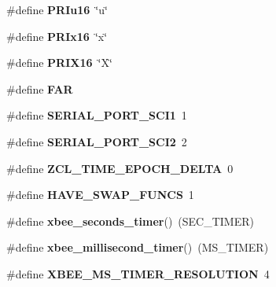 \begin{DoxyCompactItemize}
\item 
\hypertarget{group__hal__hcs08_ga86bc00ee87e8e40787e0681fc34c576a}{\#define {\bfseries P\-R\-Iu16}~\char`\"{}u\char`\"{}}\label{group__hal__hcs08_ga86bc00ee87e8e40787e0681fc34c576a}

\item 
\hypertarget{group__hal__hcs08_ga70f5e38b517f714518c970a4da37bef1}{\#define {\bfseries P\-R\-Ix16}~\char`\"{}x\char`\"{}}\label{group__hal__hcs08_ga70f5e38b517f714518c970a4da37bef1}

\item 
\hypertarget{group__hal__hcs08_ga570ca9af5087023f75fc8a1a602d26ab}{\#define {\bfseries P\-R\-I\-X16}~\char`\"{}X\char`\"{}}\label{group__hal__hcs08_ga570ca9af5087023f75fc8a1a602d26ab}

\item 
\hypertarget{group__hal__hcs08_gaef060b3456fdcc093a7210a762d5f2ed}{\#define {\bfseries F\-A\-R}}\label{group__hal__hcs08_gaef060b3456fdcc093a7210a762d5f2ed}

\item 
\hypertarget{group__hal__hcs08_ga8c212fbcc94488b4d889075a4a352278}{\#define {\bfseries S\-E\-R\-I\-A\-L\-\_\-\-P\-O\-R\-T\-\_\-\-S\-C\-I1}~1}\label{group__hal__hcs08_ga8c212fbcc94488b4d889075a4a352278}

\item 
\hypertarget{group__hal__hcs08_ga2ac2211493ad6e391d90976257a14836}{\#define {\bfseries S\-E\-R\-I\-A\-L\-\_\-\-P\-O\-R\-T\-\_\-\-S\-C\-I2}~2}\label{group__hal__hcs08_ga2ac2211493ad6e391d90976257a14836}

\item 
\hypertarget{group__hal__hcs08_ga503caf44f78cc52dc196c413cd6c78ab}{\#define {\bfseries Z\-C\-L\-\_\-\-T\-I\-M\-E\-\_\-\-E\-P\-O\-C\-H\-\_\-\-D\-E\-L\-T\-A}~0}\label{group__hal__hcs08_ga503caf44f78cc52dc196c413cd6c78ab}

\item 
\hypertarget{group__hal__hcs08_gae06d582222a6c1b1aa2996a510e5a60c}{\#define {\bfseries H\-A\-V\-E\-\_\-\-S\-W\-A\-P\-\_\-\-F\-U\-N\-C\-S}~1}\label{group__hal__hcs08_gae06d582222a6c1b1aa2996a510e5a60c}

\item 
\hypertarget{group__hal__hcs08_gae8fb830d9a707a0f6d60a2c480ed7dfc}{\#define {\bfseries xbee\-\_\-seconds\-\_\-timer}()~(S\-E\-C\-\_\-\-T\-I\-M\-E\-R)}\label{group__hal__hcs08_gae8fb830d9a707a0f6d60a2c480ed7dfc}

\item 
\hypertarget{group__hal__hcs08_gae68dcfee6e7c24b7a401c769c3fc1dd0}{\#define {\bfseries xbee\-\_\-millisecond\-\_\-timer}()~(M\-S\-\_\-\-T\-I\-M\-E\-R)}\label{group__hal__hcs08_gae68dcfee6e7c24b7a401c769c3fc1dd0}

\item 
\hypertarget{group__hal__hcs08_ga5cbeea4d9344138b657f78ad38813584}{\#define {\bfseries X\-B\-E\-E\-\_\-\-M\-S\-\_\-\-T\-I\-M\-E\-R\-\_\-\-R\-E\-S\-O\-L\-U\-T\-I\-O\-N}~4}\label{group__hal__hcs08_ga5cbeea4d9344138b657f78ad38813584}

\end{DoxyCompactItemize}
